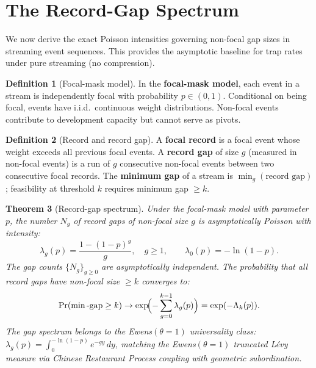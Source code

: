 \documentclass[11pt]{article}
\theoremstyle{plain}
\newtheorem{theorem}{Theorem}[section]
\theoremstyle{definition}
\newtheorem{definition}[theorem]{Definition}
\theoremstyle{remark}
\begin{document}
\section{The Record-Gap Spectrum}\label{sec:record-gap}

We now derive the exact Poisson intensities governing non-focal gap
sizes in streaming event sequences.  This provides the asymptotic
baseline for trap rates under pure streaming (no compression).

\begin{definition}[Focal-mask model]\label{def:focal-mask}
In the \textbf{focal-mask model}, each event in a stream is
independently focal with probability $p \in (0,1)$.  Conditional on
being focal, events have i.i.d.\ continuous weight distributions.
Non-focal events contribute to development capacity but cannot serve as
pivots.
\end{definition}

\begin{definition}[Record and record gap]\label{def:record-gap}
A \textbf{focal record} is a focal event whose weight exceeds all
previous focal events.  A \textbf{record gap} of size $g$ (measured in
non-focal events) is a run of $g$ consecutive non-focal events between
two consecutive focal records.  The \textbf{minimum gap} of a stream is
$\min_g(\text{record gap})$; feasibility at threshold $k$ requires
minimum gap $\ge k$.
\end{definition}

\begin{theorem}[Record-gap spectrum]\label{thm:record-gap}
Under the focal-mask model with parameter $p$, the number $N_g$ of
record gaps of non-focal size $g$ is asymptotically Poisson with
intensity:
\begin{equation}\label{eq:lambda-g}
  \lambda_g(p) = \frac{1 - (1-p)^g}{g}, \quad g \ge 1,
  \qquad
  \lambda_0(p) = -\ln(1-p).
\end{equation}
The gap counts $\{N_g\}_{g \ge 0}$ are asymptotically independent.
The probability that all record gaps have non-focal size $\ge k$
converges to:
\begin{equation}\label{eq:survival}
  \Pr(\min\text{-gap} \ge k) \to \exp\!\Bigl(-\sum_{g=0}^{k-1}
  \lambda_g(p)\Bigr) = \exp(-\Lambda_k(p)).
\end{equation}
The gap spectrum belongs to the Ewens$(\theta = 1)$ universality class:
$\lambda_g(p) = \int_0^{-\ln(1-p)} e^{-gy}\, dy$, matching the
Ewens$(\theta=1)$ truncated L\'evy measure via Chinese Restaurant
Process coupling with geometric subordination.
\end{theorem}
\end{document}
